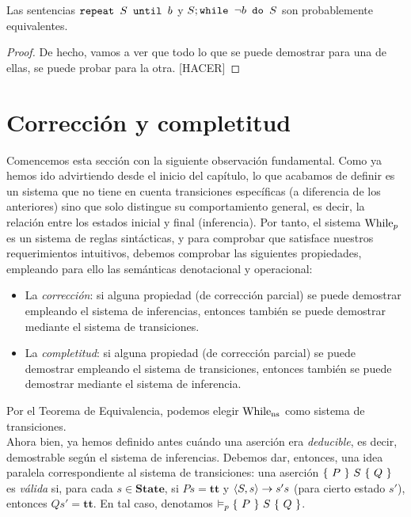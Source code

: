 \begin{prop}
Las sentencias $\texttt{repeat }S\texttt{ until }b$ y $S;\texttt{while }\neg b\texttt{ do }S$ son probablemente equivalentes.
\end{prop}
\begin{proof}
De hecho, vamos a ver que todo lo que se puede demostrar para una de ellas, se puede probar para la otra. [HACER]
\end{proof}

\section{Corrección y completitud}

Comencemos esta sección con la siguiente observación fundamental. Como ya hemos ido advirtiendo desde el inicio del capítulo, lo que acabamos de definir es un sistema que no tiene en cuenta transiciones específicas (a diferencia de los anteriores) sino que solo distingue su comportamiento general, es decir, la relación entre los estados inicial y final (inferencia). Por tanto, el sistema $\mathrm{While}_p$ es un sistema de reglas sintácticas, y para comprobar que satisface nuestros requerimientos intuitivos, debemos comprobar las siguientes propiedades, empleando para ello las semánticas denotacional y operacional:
\begin{itemize}
    \item La \textit{corrección}: si alguna propiedad (de corrección parcial) se puede demostrar empleando el sistema de inferencias, entonces también se puede demostrar mediante el sistema de transiciones.
    \item La \textit{completitud}: si alguna propiedad (de corrección parcial) se puede demostrar empleando el sistema de transiciones, entonces también se puede demostrar mediante el sistema de inferencia.
\end{itemize}
Por el Teorema de Equivalencia, podemos elegir $\mathrm{While}_{\mathrm{ns}}$ como sistema de transiciones. 
\\

Ahora bien, ya hemos definido antes cuándo una aserción era \textit{deducible}, es decir, demostrable según el sistema de inferencias. Debemos dar, entonces, una idea paralela correspondiente al sistema de transiciones: una aserción $\{\, \, P \, \, \}\, \, S\, \, \{ \, \, Q \, \, \}$ es \textit{válida} si, para cada $s\in \mathbf{State}$, si $Ps = \mathbf{tt}$ y $\langle S, s \rangle\to s's$ (para cierto estado $s'$), entonces $Qs' = \mathbf{tt}$. En tal caso, denotamos $\vDash_p \{\, \, P \, \, \}\, \, S\, \, \{ \, \, Q \, \, \}$.
\\

